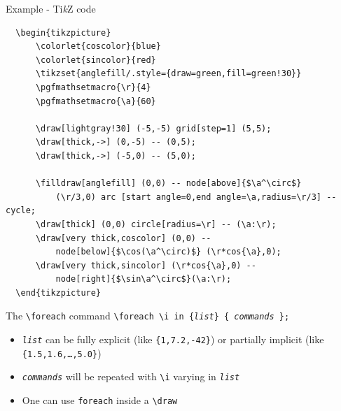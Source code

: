 \documentclass[11pt]{beamer}
\newcommand{\ti}{Ti\emph{k}Z}
\newcommand{\bs}{\textbackslash}
\begin{document}
\begin{frame}{Example - {\ti } code} 
  \begin{verbatim}
  \begin{tikzpicture}
      \colorlet{coscolor}{blue}
      \colorlet{sincolor}{red}
      \tikzset{anglefill/.style={draw=green,fill=green!30}}
      \pgfmathsetmacro{\r}{4}
      \pgfmathsetmacro{\a}{60}

      \draw[lightgray!30] (-5,-5) grid[step=1] (5,5);
      \draw[thick,->] (0,-5) -- (0,5);
      \draw[thick,->] (-5,0) -- (5,0);
	
      \filldraw[anglefill] (0,0) -- node[above]{$\a^\circ$}
          (\r/3,0) arc [start angle=0,end angle=\a,radius=\r/3] -- cycle;
      \draw[thick] (0,0) circle[radius=\r] -- (\a:\r);
      \draw[very thick,coscolor] (0,0) --
          node[below]{$\cos(\a^\circ)$} (\r*cos{\a},0);	
      \draw[very thick,sincolor] (\r*cos{\a},0) --
          node[right]{$\sin\a^\circ$}(\a:\r);
  \end{tikzpicture}
  \end{verbatim}
\end{frame}

\begin{frame}{The \texttt{\bs foreach} command}
  \texttt{\bs foreach \bs i in \{\emph{list}\} \{ \emph{commands} \};}

  \vspace{0.5cm}
  \begin{itemize}
    \item \texttt{\emph{list}} can be fully explicit (like
          \texttt{\{1,7.2,-42\}}) or partially implicit
          (like \texttt{\{1.5,1.6,\dots,5.0\}})
    \item \texttt{\emph{commands}} will be repeated with \texttt{\bs i}
          varying in \texttt{\emph{list}}
    \item One can use \texttt{foreach} inside a \texttt{\bs draw}
  \end{itemize}
\end{frame}

\end{document}
